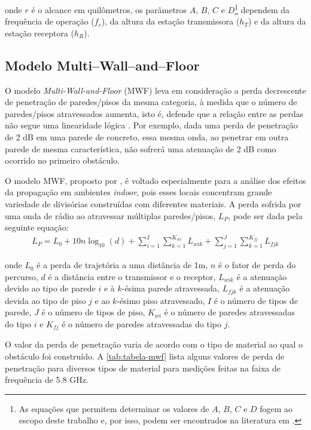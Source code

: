 \noindent onde $r$ é o alcance em quilômetros, os parâmetros $A$, $B$, $C$ e $D$\footnote[2]{As equações que permitem determinar os valores de $A$, $B$, $C$ e $D$ fogem ao escopo deste trabalho e, por isso, podem ser encontrados na literatura em .} dependem da frequência de operação ($f_c$), da altura da estação transmissora ($h_T$) e da altura da estação receptora ($h_R$).

\subsection{Modelo Multi--Wall--and--Floor}
\label{sub:modelo-MWF}

O modelo \emph{Multi-Wall-and-Floor} (MWF) leva em consideração a perda decrescente de penetração de paredes/pisos da mesma categoria, à medida que o número de paredes/pisos atravessados aumenta, isto é, defende que a relação entre as  perdas não segue uma linearidade lógica \cite{lott2001ieee}. Por exemplo, dada uma perda de penetração de 2 dB em uma parede de concreto, essa mesma onda, ao penetrar em outra parede de mesma característica, não sofrerá uma atenuação de 2 dB como ocorrido no primeiro obstáculo.

O modelo MWF, proposto por , é voltado especialmente para a análise dos efeitos da propagação em ambientes \textit{indoor}, pois esses locais concentram grande variedade de divisórias construídas com diferentes materiais. A perda sofrida por uma onda de rádio ao atravessar múltiplas paredes/pisos, $L_{P}$, pode ser dada pela seguinte equação:
\begin{equation}
	\begin{aligned}
	\label{eq:mwf}
		L_{P} = L_0 + 10n\log_{10}(d) + \sum_{i=1}^{I} \sum_{k=1}^{K_{wi}} L_{wik} + \sum_{j=1}^{J} \sum_{k=1}^{K_{fj}} L_{fjk}
	\end{aligned}
\end{equation}

\noindent onde $L_0$ é a perda de trajetória a uma distância de 1m, $n$ é o fator de perda do percurso, $d$ é a distância entre o transmissor e o receptor, $L_{wik}$ é a atenuação devido ao tipo de parede $i$ e à $k$-ésima parede atravessada, $L_{fjk}$ é a atenuação devida ao tipo de piso $j$ e ao $k$-ésimo piso atravessado, $I$ é o número de tipos de parede, $J$ é o número de tipos de piso, $K_{wi}$ é o número de paredes atravessadas do tipo $i$ e $K_{fj}$ é o número de paredes atravessadas do tipo $j$. 

O valor da perda de penetração varia de acordo com o tipo de material ao qual o obstáculo foi construído. A \autoref{tab:tabela-mwf} lista alguns valores de perda de penetração para diversos tipos de material para medições feitas na faixa de frequência de 5.8 GHz.

